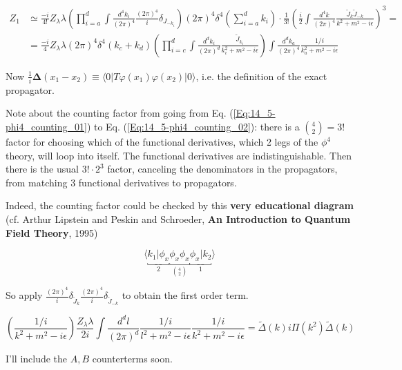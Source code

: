 \documentclass[twoside]{amsart}
\begin{document}
\begin{align}
  Z_1  & \simeq \frac{- i }{4!} Z_{\lambda} \lambda \left( \prod_{i=a}^d \int \frac{ d^4k_i}{ (2\pi)^4} \frac{ (2\pi)^4}{ i } \delta_{J_{-k_i} } \right) (2\pi)^4 \delta^4\left( \sum_{i=a}^d k_i \right) \cdot \frac{1}{3!} \left( \frac{i }{2} \int \frac{ d^4k}{ (2\pi)^4} \frac{ \widetilde{J}_k \widetilde{J}_{-k} }{ k^2 + m^2 - i \epsilon} \right)^3 = \label{Eq:14_5-phi4_counting_01} \\  
    & = \frac{- i}{4} Z_{\lambda} \lambda ( 2\pi)^4 \delta^4(k_c + k_d) \left( \prod_{i=c}^d \int \frac{d^dk_i}{ (2\pi)^d} \frac{ \widetilde{J}_{k_i} }{ k_i^2 + m^2 - i \epsilon } \right) \int \frac{ d^dk_a }{ ( 2\pi)^4} \frac{ 1/i }{ k_a^2 + m^2 - i \epsilon } \label{Eq:14_5-phi4_counting_02} 
\end{align}


Now $\frac{1}{i} \mathbf{\Delta}(x_1-x_2) \equiv \langle 0 | T\varphi(x_1) \varphi(x_2) | 0 \rangle$, i.e. the definition of the exact propagator.  

Note about the counting factor from going from Eq. (\ref{Eq:14_5-phi4_counting_01}) to Eq. (\ref{Eq:14_5-phi4_counting_02}): there is a $\binom{4}{2} = 3!$ factor for choosing which of the functional derivatives, which 2 legs of the $\phi^4$ theory, will loop into itself.  The functional derivatives are indistinguishable.  Then there is the usual $3! \cdot 2^{3}$ factor, canceling the denominators in the propagators, from matching 3 functional derivatives to propagators.  

Indeed, the counting factor could be checked by this \textbf{very educational diagram} (cf. Arthur Lipstein and Peskin and Schroeder, \textbf{An Introduction to Quantum Field Theory}, 1995)


\[
\langle \underbracket{ k_1 | \phi_x }_2 \underbracket{ \phi_x \phi_x }_{ \binom{4}{2} } \underbracket{ \phi_x | k_2 }_1 \rangle
\]



So apply $ \frac{ (2\pi)^4}{i} \delta_{\widetilde{J}_k } \frac{ (2\pi)^4}{ i } \delta_{\widetilde{J}_{-k} }$ to obtain the first order term.  

\[
\left( \frac{ 1 / i }{ k^2 + m^2 - i \epsilon } \right) \frac{ Z_{\lambda} \lambda}{2 i } \int \frac{ d^d l }{ (2\pi)^d} \frac{ 1 / i }{ l^2 + m^2 - i \epsilon } \frac{ 1 /i }{ k^2 + m^2 - i \epsilon } = \widetilde{\Delta}(k) i \Pi(k^2 ) \widetilde{\Delta}(k)
\]



I'll include the $A,B$ counterterms soon.
\end{document}
